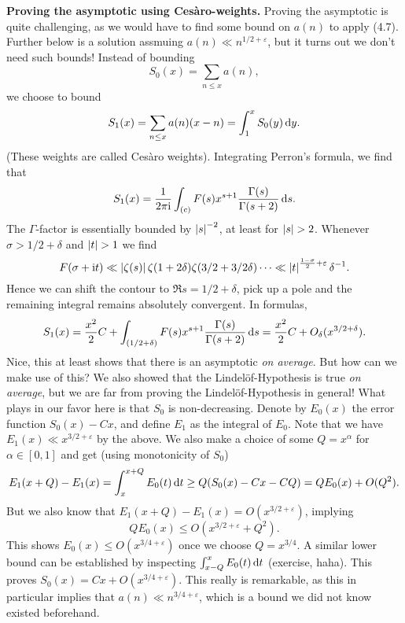 \documentclass[a4paper,11pt]{article}
\begin{document}
\textbf{Proving the asymptotic using Cesàro-weights.} Proving the asymptotic is
quite challenging, as we would have to find some bound on $a(n)$ to apply (4.7).
Further below is a solution assmuing $a(n) \ll n^{1/2+\varepsilon}$, but 
it turns out we don't need such bounds! Instead of bounding 
\[
    S_0(x) = \sum_{n \leq x} a(n),
\]
we choose to bound
\[
    S_1(x) = \sum_{n \leq x} a(n) (x-n) = \int_1^x S_0(y) \mathrm{\,d} y.
\]
(These weights are called Cesàro weights). 
Integrating Perron's formula, we find that 
\[
    S_1(x) = \frac{1}{2 \pi \mathrm i} \int_{(c)} F(s) x^{s+1} \frac{\Gamma(s)}{\Gamma(s+2)} \mathrm{\,d} s.
\]
The $\Gamma$-factor is essentially bounded by $\left\lvert s \right\rvert^{-2}$, at least for 
$\left\lvert s \right\rvert > 2$. Whenever $\sigma > 1/2 + \delta$ and $\left\lvert t \right\rvert > 1$ we find  
$$F(\sigma + \mathrm i t) \ll \left\lvert \zeta(s) \right\rvert \zeta(1+2\delta) \zeta(3/2+3/2\delta) \cdots
\ll \left\lvert t \right\rvert^{\frac {1-\sigma}2 + \varepsilon} \delta^{-1}.$$
Hence we can shift the contour to $\Re s = 1/2+\delta$, pick up a pole and the 
remaining integral remains absolutely convergent. In formulas,
\[
    S_1(x) = \frac{x^2}2 C + \int_{(1/2+\delta)} F(s) x^{s+1}
    \frac{\Gamma(s)}{\Gamma(s+2)} \mathrm{\,d} s = \frac{x^2}2 C +
    O_\delta(x^{3/2+\delta}).
\]
Nice, this at least shows that there is an asymptotic \textit{on average}. But
how can we make use of this? We also showed that the Lindelöf-Hypothesis is true
\textit{on average}, but we are far from proving the Lindelöf-Hypothesis in
general! What plays in our favor here is that $S_0$ is non-decreasing. Denote
by $E_0(x)$ the error function $S_0(x) - Cx$, and define $E_1$ as the integral
of $E_0$. Note that we have $E_1(x) \ll x^{3/2+\varepsilon}$ by the above. 
We also make a choice of some $Q = x^\alpha$ for $\alpha \in [0,1]$ and get
(using monotonicity of $S_0$)
\[
    E_1(x+Q)-E_1(x) = \int_x^{x+Q} E_0(t) \mathrm{\,d} t \geq Q(S_0(x) - Cx - CQ) = QE_0(x) + O(Q^2).
\]
But we also know that $E_1(x+Q)-E_1(x) = O(x^{3/2+\varepsilon})$, implying
\[
    QE_0(x) \leq O(x^{3/2+\varepsilon}+Q^2).
\]
This shows $E_0(x) \leq O(x^{3/4+\varepsilon})$ once we choose $Q=x^{3/4}$. A similar
lower bound can be established by inspecting $\int_{x-Q}^x E_0(t) \mathrm{\,d} t$ (exercise, 
haha). This proves $S_0(x) = Cx + O(x^{3/4+\varepsilon})$. This really is remarkable,
as this in particular implies that $a(n) \ll n^{3/4 + \varepsilon}$, which is a 
bound we did not know existed beforehand. 
\end{document}
